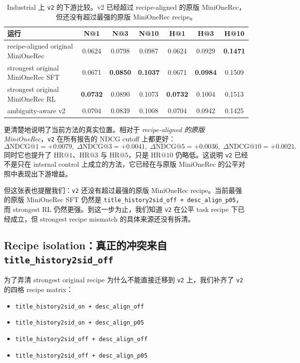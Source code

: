 \begin{table}[t]
  \centering
  \caption{Industrial 上 \texttt{v2} 的下游比较。v2 已经超过 recipe-aligned 的原版 MiniOneRec，但还没有超过最强的原版 MiniOneRec recipe。}
  \label{tab:v2sft}
  \begin{tabular}{lcccccc}
    \toprule
    运行 & N@1 & N@3 & N@10 & H@1 & H@3 & H@10 \\
    \midrule
    recipe-aligned original MiniOneRec & 0.0624 & 0.0798 & 0.0987 & 0.0624 & 0.0929 & \textbf{0.1471} \\
    strongest original MiniOneRec SFT & 0.0671 & \textbf{0.0850} & \textbf{0.1037} & 0.0671 & \textbf{0.0984} & 0.1509 \\
    strongest original MiniOneRec RL & \textbf{0.0732} & 0.0890 & 0.1073 & \textbf{0.0732} & 0.1004 & 0.1513 \\
    ambiguity-aware v2 & 0.0704 & 0.0839 & 0.1008 & 0.0704 & 0.0942 & 0.1425 \\
    \bottomrule
  \end{tabular}
\end{table}

 更清楚地说明了当前方法的真实位置。相对于 \emph{recipe-aligned 的原版 MiniOneRec}，\texttt{v2} 在所有报告的 NDCG cutoff 上都更好：
\[
\Delta \mathrm{NDCG}@1 = +0.0079,\;
\Delta \mathrm{NDCG}@3 = +0.0041,\;
\Delta \mathrm{NDCG}@5 = +0.0036,\;
\Delta \mathrm{NDCG}@10 = +0.0021.
\]
同时它也提升了 $\mathrm{HR}@1$、$\mathrm{HR}@3$ 与 $\mathrm{HR}@5$，只是 \(\mathrm{HR}@10\) 仍略低。这说明 \texttt{v2} 已经不是只在 internal control 上成立的方法，它已经在与原版 MiniOneRec 的公平对照中表现出下游增益。

但这张表也提醒我们：\texttt{v2} 还没有超过最强的原版 MiniOneRec recipe。当前最强的原版 MiniOneRec SFT 仍然是 \texttt{title\_history2sid\_off + desc\_align\_p05}，而 strongest RL 仍然更强。到这一步为止，我们知道 \texttt{v2} 在公平 task recipe 下已经成立，但 strongest recipe mismatch 的具体来源还没有拆清。

\subsection{Recipe isolation：真正的冲突来自 \texttt{title\_history2sid\_off}}

为了弄清 strongest original recipe 为什么不能直接迁移到 \texttt{v2} 上，我们补齐了 \texttt{v2} 的四格 recipe matrix：
\begin{itemize}[leftmargin=1.4em]
  \item \texttt{title\_history2sid\_on + desc\_align\_off}
  \item \texttt{title\_history2sid\_on + desc\_align\_p05}
  \item \texttt{title\_history2sid\_off + desc\_align\_off}
  \item \texttt{title\_history2sid\_off + desc\_align\_p05}
\end{itemize}

